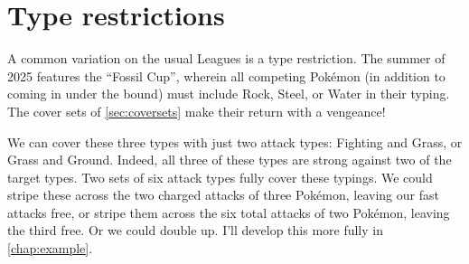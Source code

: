 

\section{Type restrictions\label{sec:typeleagues}}
A common variation on the usual Leagues is a type restriction.
The summer of 2025 features the ``Fossil Cup'', wherein all competing
  Pokémon (in addition to coming in under the  bound)
  must include Rock, Steel, or Water in their typing.
The cover sets of \autoref{sec:coversets} make their return with a vengeance!

We can cover these three types with just two attack types: Fighting and Grass, or Grass and Ground.
Indeed, all three of these types are strong against two of the target types.
Two sets of six attack types fully cover these typings.
We could stripe these across the two charged attacks of three Pokémon,
  leaving our fast attacks free, or stripe them across the six total
  attacks of two Pokémon, leaving the third free.
Or we could double up.
I'll develop this more fully in \autoref{chap:example}.
